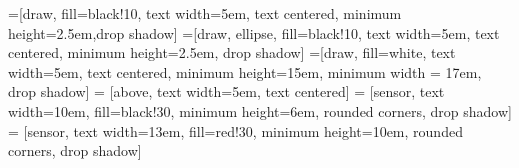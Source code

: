 \newcommand{\mx}[1]{\mathbf{\bm{#1}}} %
\newcommand{\vc}[1]{\mathbf{\bm{#1}}} %



=[draw, fill=black!10, text width=5em,
    text centered, minimum height=2.5em,drop shadow]
=[draw, ellipse, fill=black!10, text width=5em,
    text centered, minimum height=2.5em, drop shadow]
=[draw, fill=white, text width=5em,
    text centered, minimum height=15em, minimum width = 17em, drop shadow]
 = [above, text width=5em, text centered]
 = [sensor, text width=10em, fill=black!30,
    minimum height=6em, rounded corners, drop shadow]
 = [sensor, text width=13em, fill=red!30,
    minimum height=10em, rounded corners, drop shadow]


\def\blockdist{1.5}
\def\edgedist{2.5}

